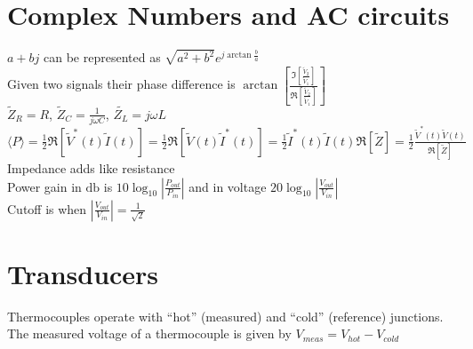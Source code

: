 \documentclass[10pt,landscape,letterpaper]{cheatsheet}
\newcommand{\ti}[1]{\widetilde{#1}}
\begin{document}
\section*{Complex Numbers and AC circuits}
$a+bj$ can be represented as $\sqrt{a^2+b^2}e^{j\arctan{\frac{b}{a}}}$\\
Given two signals their phase difference is $\arctan\left[\displaystyle\frac{\Im\left[\frac{\ti{V}_2}{\ti{V}_1}\right]}{\Re\left[\frac{\ti{V}_2}{\ti{V}_1}\right]}\right]$\\
$\ti{Z}_R=R$, $\ti{Z}_C=\frac{1}{j\omega C}$, $\ti{Z_L}=j\omega L$\\
$\langle P\rangle=\frac{1}{2}\Re\left[\ti{V}^*(t)\ti{I}(t)\right]=\frac{1}{2}\Re\left[\ti{V}(t)\ti{I}^*(t)\right]
=\frac{1}{2}\ti{I}^*(t)\ti{I}(t)\Re\left[\ti{Z}\right]=\frac{1}{2}\frac{\ti{V}^*(t)\ti{V}(t)}{\Re\left[\ti{Z}\right]}$\\
Impedance adds like resistance\\
Power gain in $\unit{\decibel}$ is $10\log_{10}\left|\frac{P_{out}}{P_{in}}\right|$ and in voltage $20\log_{10}\left|\frac{V_{out}}{V_{in}}\right|$\\
Cutoff is when $\left|\frac{V_{out}}{V_{in}}\right|=\frac{1}{\sqrt{2}}$
\section*{Transducers}
Thermocouples operate with ``hot'' (measured) and ``cold'' (reference) junctions. The measured voltage of a thermocouple is given by $V_{meas}=V_{hot}-V_{cold}$
\end{document}

